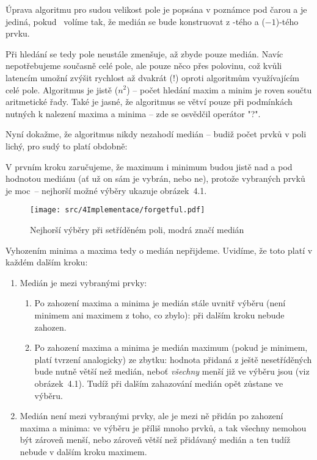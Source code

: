         Úprava algoritmu pro sudou velikost pole je popsána v poznámce pod čarou a je jediná, pokud \kk~volíme tak, že medián se bude konstruovat z \kk-tého a (\kk$-1$)-tého prvku.
         
        Při hledání se tedy pole neustále zmenšuje, až zbyde pouze medián. Navíc nepotřebujeme současně celé pole, ale pouze něco přes polovinu, což kvůli latencím umožní zvýšit rychlost až dvakrát (!) oproti algoritmům využívajícím celé pole. Algoritmus je jistě \OOO($n^2$) -- počet hledání maxim a minim je roven součtu aritmetické řady. Také je jasné, že algoritmus se větví pouze při podmínkách nutných k nalezení maxima a minima -- zde se osvědčil operátor \Vr"?".

        Nyní dokažme, že algoritmus nikdy nezahodí medián -- budiž počet prvků v poli lichý, pro sudý to platí obdobně:

        V prvním kroku zaručujeme, že maximum i minimum budou jistě nad a pod hodnotou mediánu (ať už on sám je vybrán, nebo ne), protože vybraných prvků je \bq moc\eq ~-- nejhorší možné výběry ukazuje obrázek~4.1.
        \begin{figure}[h]
        \begin{center}
          \texttt{[image: src/4Implementace/forgetful.pdf]}
          \caption{Nejhorší výběry při setříděném poli, modrá značí medián}
          \end{center}
        \end{figure}\label{obr forgetful}
        Vyhozením minima a maxima tedy o medián nepřijdeme. Uvidíme, že toto platí v každém dalším kroku:
        \begin{enumerate}
          \item Medián je mezi vybranými prvky:
            \begin{enumerate}
                \item Po zahození maxima a minima je medián stále uvnitř výběru (není minimem ani maximem z toho, co zbylo): při dalším kroku nebude zahozen.
                \item Po zahození maxima a minima je medián maximum (pokud je minimem, platí tvrzení analogicky) ze zbytku: hodnota přidaná z ještě nesetříděných bude nutně větší než medián, neboť \emph{všechny} menší již ve výběru jsou (viz obrázek~4.1). Tudíž při dalším zahazování medián opět zůstane ve výběru.
            \end{enumerate}
          \item Medián není mezi vybranými prvky, ale je mezi ně přidán po zahození maxima a minima: ve výběru je příliš mnoho prvků, a tak všechny nemohou být zároveň menší, nebo zároveň větší než přidávaný medián a ten tudíž nebude v dalším kroku maximem.
        \end{enumerate}

